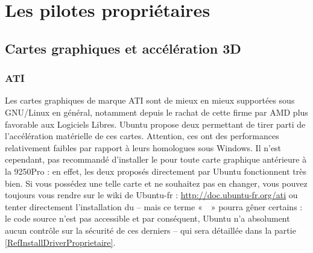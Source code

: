 \section{Les pilotes propriétaires}
\label{RefInstallProprio}
\subsection{Cartes graphiques et accélération 3D}
\subsubsection{ATI}
Les cartes graphiques de marque ATI sont de mieux en mieux supportées sous GNU/Linux en général, notamment depuis le rachat de cette firme par AMD plus favorable aux Logiciels Libres. Ubuntu propose deux  permettant de tirer parti de l'accélération matérielle de ces cartes. Attention, ces  ont des performances relativement faibles par rapport à leurs homologues sous Windows. Il n'est cependant, pas recommandé d'installer le   pour toute carte graphique antérieure à la 9250Pro : en effet, les deux   proposés directement par Ubuntu fonctionnent très bien. Si vous possédez une telle carte et ne souhaitez pas en changer, vous pouvez toujours vous rendre sur le wiki de Ubuntu-fr : \url{http://doc.ubuntu-fr.org/ati} ou tenter directement l'installation du   -- mais ce terme «~~» pourra gêner certains : le code source n'est pas accessible et par conséquent, Ubuntu n'a absolument aucun contrôle sur la sécurité de ces derniers -- qui sera détaillée dans la partie \ref{RefInstallDriverProprietaire}.
